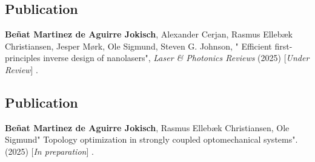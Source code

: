 \vspace*{0.4\textheight}
\begin{center}
  \begin{minipage}{0.9\linewidth}
    \section*{Publication \cite{ownpub4}}
    \textbf{Beñat Martinez de Aguirre Jokisch}, Alexander Cerjan, Rasmus Ellebæk Christiansen, Jesper Mørk, Ole Sigmund, Steven G. Johnson, "
    Efficient first-principles inverse design of nanolasers", \textit{Laser \& Photonics Reviews} (2025) [\textit{Under Review}] .
  \end{minipage}
\end{center}
\newpage


\vspace*{0.4\textheight}
\begin{center}
  \begin{minipage}{0.9\linewidth}
    \section*{Publication \cite{ownpub5}}
    \textbf{Beñat Martinez de Aguirre Jokisch}, Rasmus Ellebæk Christiansen, Ole Sigmund"
    Topology optimization in strongly coupled optomechanical systems". (2025) [\textit{In preparation}] .
  \end{minipage}
\end{center}
\newpage


%

